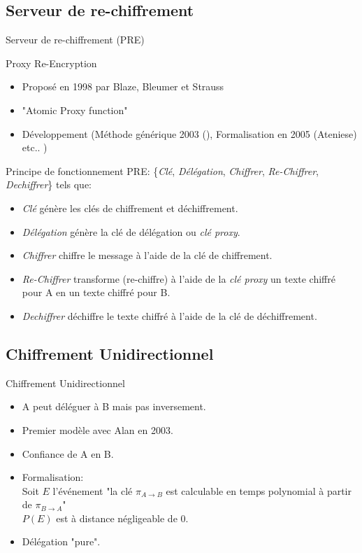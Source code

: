 \documentclass{beamer}
\begin{document}
\subsection{Serveur de re-chiffrement}
\begin{frame}{Serveur de re-chiffrement (PRE)}
	\begin{block}{Proxy Re-Encryption}
		\begin{itemize}
			\item Proposé en 1998 par Blaze, Bleumer et Strauss \pause
			\item "Atomic Proxy function" \pause
			\item Développement (Méthode générique 2003 (), Formalisation en 2005 (Ateniese) etc.. ) \pause 
		\end{itemize}
	\end{block}
	\begin{block}{Principe de fonctionnement}
	PRE:  \{\textit{Clé}, \textit{Délégation}, \textit{Chiffrer}, \textit{Re-Chiffrer}, \textit{Dechiffrer}\} tels que: \pause
	\begin{itemize}
		\item \textit{Clé} génère les clés de chiffrement et déchiffrement. \pause
		\item \textit{Délégation} génère la clé de délégation ou \textit{clé proxy}. \pause
		\item \textit{Chiffrer} chiffre le message à l'aide de la clé de chiffrement. \pause
		\item \textit{Re-Chiffrer} transforme (re-chiffre) à l'aide de la \textit{clé proxy} un texte chiffré pour A en un texte chiffré pour B. \pause
		\item  \textit{Dechiffrer} déchiffre le texte chiffré à l'aide de la clé de déchiffrement. \pause
	\end{itemize}
	\end{block}
\end{frame}


\subsection{Chiffrement Unidirectionnel}
\begin{frame}{Chiffrement Unidirectionnel}
	
	\begin{itemize}
		\item A peut déléguer à B mais pas inversement. \pause
		\item Premier modèle avec Alan en 2003. \pause
		\item Confiance de A en B. \pause
		\item Formalisation:\\ \pause
		Soit $E$ l'événement "la clé $\pi_{A\to B}$ est calculable en temps polynomial à partir de $\pi_{B\to A}$"\\ \pause
		$P(E)$ est à distance négligeable de 0. \pause
		\item Délégation "pure". \pause
	\end{itemize}
	
\end{frame}
\end{document}
